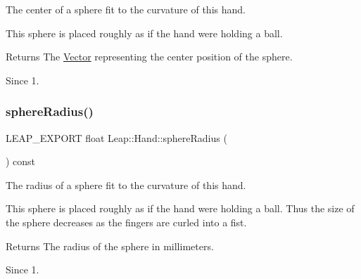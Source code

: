 The center of a sphere fit to the curvature of this hand.


\begin{DoxyCodeInclude}
\end{DoxyCodeInclude}


This sphere is placed roughly as if the hand were holding a ball.



\begin{DoxyReturn}{Returns}
The \hyperlink{struct_leap_1_1_vector}{Vector} representing the center position of the sphere. 
\end{DoxyReturn}
\begin{DoxySince}{Since}
1. 
\end{DoxySince}
\mbox{\label{class_leap_1_1_hand_a3ff1cd29c23c1aa2c6482932b9a8fb1e}} 
\subsubsection{\texorpdfstring{sphere\+Radius()}{sphereRadius()}}
{\footnotesize\ttfamily L\+E\+A\+P\+\_\+\+E\+X\+P\+O\+RT float Leap\+::\+Hand\+::sphere\+Radius (\begin{DoxyParamCaption}{ }\end{DoxyParamCaption}) const}

The radius of a sphere fit to the curvature of this hand.

This sphere is placed roughly as if the hand were holding a ball. Thus the size of the sphere decreases as the fingers are curled into a fist.


\begin{DoxyCodeInclude}
\end{DoxyCodeInclude}


\begin{DoxyReturn}{Returns}
The radius of the sphere in millimeters. 
\end{DoxyReturn}
\begin{DoxySince}{Since}
1. 
\end{DoxySince}
\mbox{\label{class_leap_1_1_hand_acc0aa1360411dee646658fed75b056cf}} 
